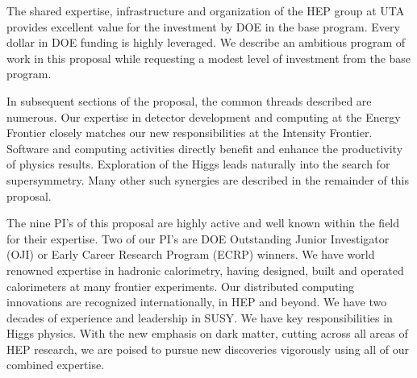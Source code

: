The shared expertise, infrastructure and organization of the HEP group at UTA provides excellent value for the investment by DOE in the base program. Every dollar in DOE funding is highly leveraged. We describe an ambitious program of work in this proposal while requesting a modest level of investment from the base program.

In subsequent sections of the proposal, the common threads described are numerous. Our expertise in detector development and computing at the Energy Frontier closely matches our new responsibilities at the Intensity Frontier. Software and computing activities directly benefit and enhance the productivity of physics results. Exploration of the Higgs leads naturally into the search for supersymmetry. Many other such synergies are described in the remainder of this proposal.

The nine PI's of this proposal are highly active and well known within the field for their expertise. Two of our PI's are DOE Outstanding Junior Investigator (OJI) or Early Career Research Program (ECRP) winners. We have world renowned expertise in hadronic calorimetry, having designed, built and operated calorimeters at many frontier experiments. Our distributed computing innovations are recognized internationally, in HEP and beyond. We have two decades of experience and leadership in SUSY. We have key responsibilities in Higgs physics. With the new emphasis on dark matter, cutting across all areas of HEP research, we are poised to pursue new discoveries vigorously using all of our combined expertise.
